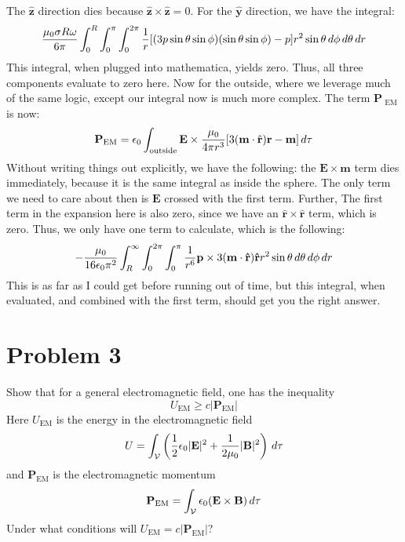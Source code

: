 \documentclass[10pt]{article}
\begin{document}
\begin{solution}
		The \( \mathbf{\hat{z}} \) direction dies because \( \mathbf{\hat{z}} \times \mathbf{\hat{z}} = 0 \).
		For the \( \mathbf{\hat{y}} \) direction, we have the integral:
		\[
			\frac{\mu_0 \sigma R \omega}{6\pi} \int_0^{R}\int_{0}^{\pi}\int_{0}^{2\pi} \frac{1}{r}[(3 p \sin
			\theta \sin \phi)(\sin \theta \sin \phi) - p ] r^2 \sin \theta \,d \phi \,d \theta \,d r
		\]
		This integral, when plugged into mathematica, yields zero. Thus, all three components evaluate to
		zero here. Now for the outside, where we leverage much of the same logic, except our integral now is
		much more complex. The term \( \mathbf{P}_\text{ EM} \) is now:
		\[
			\mathbf{P}_\text{EM} = \epsilon_0 \int_\text{outside} \mathbf{E} \times \frac{\mu_0}{4\pi r^3} [3
			(\mathbf{m} \cdot \hat{\mathbf{r}}) \mathbf{r} - \mathbf{m}] \,d \tau
		\]
		Without writing things out explicitly, we have the following: the \( \mathbf{E} \times \mathbf{m} \)
		term dies immediately, because it is the same integral as inside the sphere. The only term we need to
		care about then is \( \mathbf{E} \) crossed with the first term. Further, The first term in the
		expansion here is also zero, since we have an \( \mathbf{\hat{r}} \times \mathbf{\hat{r}} \) term,
		which is zero. Thus, we only have one term to calculate, which is the following:
		\[
			-\frac{\mu_0}{16 \epsilon_0 \pi^2} \int_R^{\infty} \int_{0}^{2\pi} \int_{0}^{\pi}
			\frac{1}{r^{6}}\mathbf{p} \times 3(\mathbf{m} \cdot \mathbf{\hat{r}}) \mathbf{\hat{r}} r^2 \sin
			\theta \,d \theta \,d \phi \,d r
		\]
		This is as far as I could get before running out of time, but this integral, when evaluated, and
		combined with the first term, should get you the right answer. 
	\end{solution}	

	\pagebreak
	\section*{Problem 3}
	Show that for a general electromagnetic field, one has the inequality
	\[
		U_\text{EM} \geq c |\mathbf{P}_\text{EM}|
	\]
	Here \( U_\text{EM} \) is the energy in the electromagnetic field
	\[
		U = \int_{\mathcal{V}} \left( \frac{1}{2}\epsilon_0 |\mathbf{E}|^2 + \frac{1}{2\mu_0}|\mathbf{B}|^2
		\right) \,d \tau
	\]
	and \( \mathbf{P}_\text{EM} \) is the electromagnetic momentum
	\[
		\mathbf{P}_\text{EM} = \int_{\mathcal{V}} \epsilon_0 (\mathbf{E} \times \mathbf{B}) \,d \tau
	\]
	Under what conditions will \( U_\text{EM} = c |\mathbf{P}_\text{EM}| \)?
\end{document}
